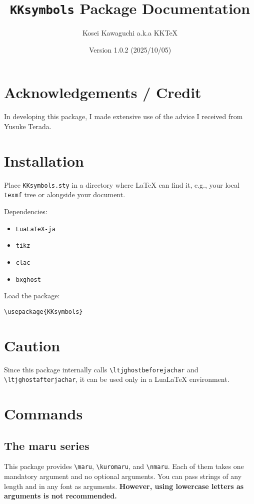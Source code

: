 \documentclass[luatex,fontsize=10pt,paper=b5,twoside]{jlreq}%
\title{\texttt{KKsymbols} Package Documentation}
\author{Kosei Kawaguchi a.k.a KKTeX}
\date{Version 1.0.2 (2025/10/05)}
\begin{document}
\begin{titlepage}
  \maketitle
\end{titlepage}
\newpage
\tableofcontents
\newpage

\section{Acknowledgements / Credit}
In developing this package, I made extensive use of the advice I received from Yusuke Terada.

\section{Installation}
Place \texttt{KKsymbols.sty} in a directory where LaTeX can find it, e.g., your local \texttt{texmf} tree or alongside your document.

Dependencies:
\begin{itemize}
    \item \texttt{LuaLaTeX-ja}
    \item \texttt{tikz}
    \item \texttt{clac}
    \item \texttt{bxghost}
\end{itemize}

Load the package:

\begin{verbatim}
\usepackage{KKsymbols}
\end{verbatim}

\section{Caution}
Since this package internally calls \verb|\ltjghostbeforejachar| and \verb|\ltjghostafterjachar|, it can be used only in a LuaLaTeX environment.

\section{Commands}
\subsection{The maru series}
This package provides \verb|\maru|, \verb|\kuromaru|, and \verb|\nmaru|. Each of them takes one mandatory argument and no optional arguments. You can pass strings of any length and in any font as arguments. \textbf{However, using lowercase letters as arguments is not recommended.}
\end{document}
